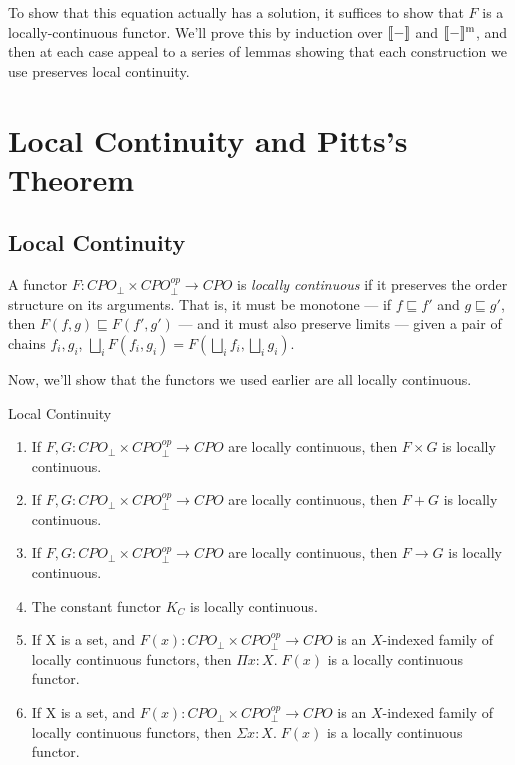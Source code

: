 To show that this equation actually has a solution, it suffices to 
show that $F$ is a locally-continuous functor. We'll prove this by 
induction over $[\![{-}]\!]$ and $[\![{-}]\!]^{\mathrm{m}}$, and then at each
case appeal to a series of lemmas showing that each construction we
use preserves local continuity. 

\section{Local Continuity and Pitts's Theorem}

\subsection{Local Continuity}

A functor $F : CPO_\bot \times CPO^{op}_\bot \to CPO$ is \emph{locally
  continuous} if it preserves the order structure on its arguments.
That is, it must be monotone --- if $f \sqsubseteq f'$ and $g
\sqsubseteq g'$, then $F(f, g) \sqsubseteq F(f', g')$ --- and it
must also preserve limits --- given a pair of chains $f_i, g_i$, 
$\bigsqcup_i F(f_i, g_i) = F(\bigsqcup_i f_i, \bigsqcup_i g_i)$. 

Now, we'll show that the functors we used earlier are all locally 
continuous. 

\begin{lemma}{Local Continuity}
\begin{enumerate}
\item If $F,G : CPO_\bot \times CPO^{op}_\bot \to CPO$ are locally continuous,
      then $F \times G$ is locally continuous.  
\item If $F,G : CPO_\bot \times CPO^{op}_\bot \to CPO$ are locally continuous,
      then $F + G$ is locally continuous.  
\item If $F,G : CPO_\bot \times CPO^{op}_\bot \to CPO$ are locally continuous,
      then $F \to G$ is locally continuous.  
\item The constant functor $K_C$ is locally continuous. 
\item If X is a set, and $F(x) : CPO_\bot \times CPO^{op}_\bot \to CPO$ is an
      $X$-indexed family of locally continuous functors, then 
      $\Pi x:X.\;F(x)$ is a locally continuous functor. 
\item If X is a set, and $F(x) : CPO_\bot \times CPO^{op}_\bot \to CPO$ is an
      $X$-indexed family of locally continuous functors, then 
      $\Sigma x:X.\;F(x)$ is a locally continuous functor. 
\end{enumerate}
\end{lemma}
 

